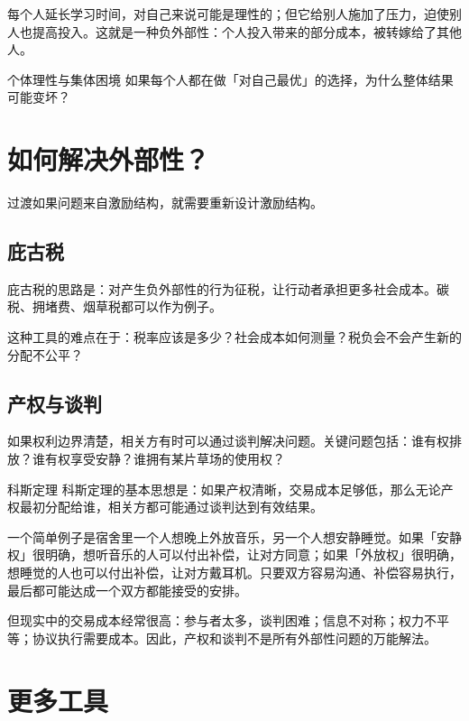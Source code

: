 \documentclass[10pt,a4paper]{ctexart}
\newcommand{\transitionnote}[1]{\begin{conceptbox}{过渡}#1\end{conceptbox}}
\begin{document}
每个人延长学习时间，对自己来说可能是理性的；但它给别人施加了压力，迫使别人也提高投入。这就是一种负外部性：个人投入带来的部分成本，被转嫁给了其他人。

\begin{discussionbox}{个体理性与集体困境}
如果每个人都在做「对自己最优」的选择，为什么整体结果可能变坏？
\end{discussionbox}

\section{如何解决外部性？}

\transitionnote{如果问题来自激励结构，就需要重新设计激励结构。}

\subsection{庇古税}

庇古税的思路是：对产生负外部性的行为征税，让行动者承担更多社会成本。碳税、拥堵费、烟草税都可以作为例子。

这种工具的难点在于：税率应该是多少？社会成本如何测量？税负会不会产生新的分配不公平？

\subsection{产权与谈判}

如果权利边界清楚，相关方有时可以通过谈判解决问题。关键问题包括：谁有权排放？谁有权享受安静？谁拥有某片草场的使用权？

\begin{conceptbox}{科斯定理}
科斯定理的基本思想是：如果产权清晰，交易成本足够低，那么无论产权最初分配给谁，相关方都可能通过谈判达到有效结果。

一个简单例子是宿舍里一个人想晚上外放音乐，另一个人想安静睡觉。如果「安静权」很明确，想听音乐的人可以付出补偿，让对方同意；如果「外放权」很明确，想睡觉的人也可以付出补偿，让对方戴耳机。只要双方容易沟通、补偿容易执行，最后都可能达成一个双方都能接受的安排。
\end{conceptbox}

但现实中的交易成本经常很高：参与者太多，谈判困难；信息不对称；权力不平等；协议执行需要成本。因此，产权和谈判不是所有外部性问题的万能解法。

\section{更多工具}
\end{document}
